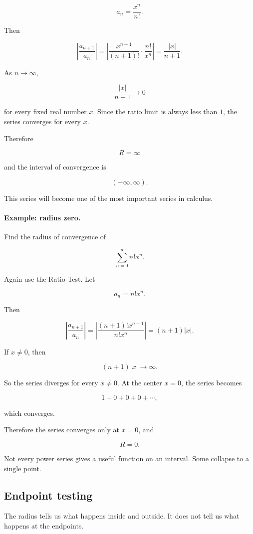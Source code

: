 \[
a_n=\frac{x^n}{n!}.
\]

Then

\[
\left|\frac{a_{n+1}}{a_n}\right|
=
\left|\frac{x^{n+1}}{(n+1)!}\cdot \frac{n!}{x^n}\right|
=
\frac{|x|}{n+1}.
\]

As \(n\to\infty\),

\[
\frac{|x|}{n+1}\to0
\]

for every fixed real number \(x\).  Since the ratio limit is always less than \(1\), the
series converges for every \(x\).

Therefore

\[
\boxed{R=\infty}
\]

and the interval of convergence is

\[
\boxed{(-\infty,\infty).}
\]

This series will become one of the most important series in calculus.

\paragraph{Example: radius zero.}
Find the radius of convergence of

\[
\sum_{n=0}^{\infty} n!x^n.
\]

Again use the Ratio Test.  Let

\[
a_n=n!x^n.
\]

Then

\[
\left|\frac{a_{n+1}}{a_n}\right|
=
\left|\frac{(n+1)!x^{n+1}}{n!x^n}\right|
=
(n+1)|x|.
\]

If \(x\neq0\), then

\[
(n+1)|x|\to\infty.
\]

So the series diverges for every \(x\neq0\).  At the center \(x=0\), the series becomes

\[
1+0+0+0+\cdots,
\]

which converges.

Therefore the series converges only at \(x=0\), and

\[
\boxed{R=0.}
\]

Not every power series gives a useful function on an interval.  Some collapse to a
single point.

\subsection{Endpoint testing}
\label{subsec:endpoint-testing-power-series}

The radius tells us what happens inside and outside.  It does not tell us what happens
at the endpoints.

